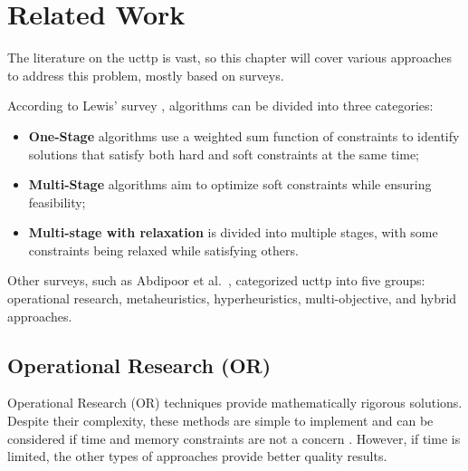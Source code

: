 
\chapter{Related Work}


\label{Related Work}

The literature on the \ac{ucttp} is vast, so this chapter will cover various approaches to address this problem, mostly based on surveys.

According to Lewis' survey \cite{lewis_survey_2008}, algorithms can be divided into three categories:

\begin{itemize}
	\item \textbf{One-Stage} algorithms use a weighted sum function of constraints to identify solutions that satisfy both hard and soft constraints at the same time;
	\item \textbf{Multi-Stage} algorithms aim to optimize soft constraints while ensuring feasibility;
	\item \textbf{Multi-stage with relaxation} is divided into multiple stages, with some constraints being relaxed while satisfying others.
\end{itemize}

Other surveys, such as Abdipoor et al.\ \cite{abdipoor_meta-heuristic_2023}, categorized \ac{ucttp} into five groups: operational research, metaheuristics, hyperheuristics, multi-objective, and hybrid approaches.

\section{Operational Research (OR)}

Operational Research (OR) techniques provide mathematically rigorous solutions. Despite their complexity, these methods are simple to implement and can be considered if time and memory constraints are not a concern \cite{babaei_survey_2015}. However, if time is limited, the other types of approaches provide better quality results. 

